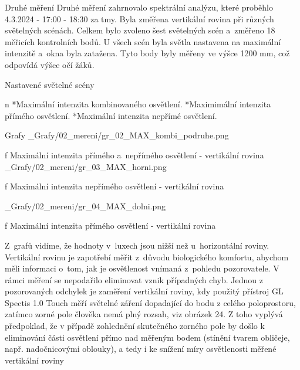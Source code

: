 \sec Druhé měření
Druhé měření zahrnovalo spektrální analýzu, které proběhlo 4.3.2024 - 17:00 - 18:30 za tmy. Byla změřena vertikální rovina při různých světelných scénách.
Celkem bylo zvoleno šest světelných scén a~změřeno 18 měřicích kontrolních bodů. U všech scén byla světla nastavena na maximální intenzitě a~okna byla zatažena.
Tyto body byly měřeny ve výšce 1200 mm, což odpovídá výšce očí žáků.
\medskip

{\sbf Nastavené světelné scény}

\begitems \style n
    *Maximální intenzita kombinovaného osvětlení.
    *Maximimální intenzita přímého osvětlení.
    *Maximální intenzita nepřímé osvětlení.
\enditems

\secc Grafy
\medskip {}
\picw=15cm _Grafy/02_mereni/gr_02_MAX_kombi_podruhe.png
\caption/f Maximální intenzita přímého a~nepřímého osvětlení - vertikální rovina
\medskip {}
\picw=15cm _Grafy/02_mereni/gr_03_MAX_horni.png
\caption/f Maximální intenzita nepřímého osvětlení - vertikální rovina

\medskip {}
\picw=15cm _Grafy/02_mereni/gr_04_MAX_dolni.png
\caption/f Maximální intenzita přímého osvětlení - vertikální rovina
\medskip

Z~grafů vidíme, že hodnoty v~luxech jsou nižší než u~horizontální roviny. 
Vertikální rovinu je zapotřebí měřit z~důvodu biologického komfortu, abychom měli informaci o~tom,
jak je osvětlenost vnímaná z~pohledu pozorovatele.
\medskip
V rámci měření se nepodařilo eliminovat vznik případných chyb. Jednou
z pozorovaných odchylek je zaměření vertikální roviny, kdy použitý přístroj GL Spectis
1.0 Touch měří světelné záření dopadající do bodu z celého poloprostoru, zatímco zorné
pole člověka nemá plný rozsah, viz obrázek 24. Z toho vyplývá předpoklad, že v případě
zohlednění skutečného zorného pole by došlo k eliminování části osvětlení přímo nad
měřeným bodem (stínění tvarem obličeje, např. nadočnicovými oblouky), a tedy i ke
snížení míry osvětlenosti měřené vertikální roviny



